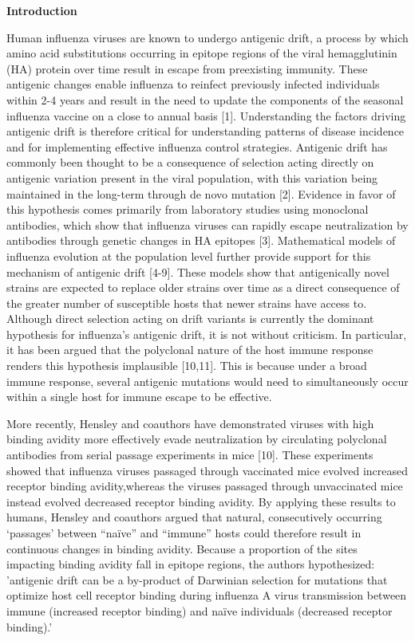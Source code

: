 \documentclass[12pt,a4paper]{article}
\begin{document}
\clearpage

{\bf Introduction}

Human influenza viruses are known to undergo antigenic drift, a process by which amino acid substitutions occurring in epitope regions of the viral hemagglutinin (HA) protein over time result in escape from preexisting immunity. These antigenic changes enable influenza to reinfect previously infected individuals within 2-4 years and result in the need to update the components of the seasonal influenza vaccine on a close to annual basis [1]. Understanding the factors driving antigenic drift is therefore critical for understanding patterns of disease incidence and for implementing effective influenza control strategies.
Antigenic drift has commonly been thought to be a consequence of selection acting directly on antigenic variation present in the viral population, with this variation being maintained in the long-term through de novo mutation [2]. Evidence in favor of this hypothesis comes primarily from laboratory studies using monoclonal antibodies, which show that influenza viruses can rapidly escape neutralization by antibodies through genetic changes in HA epitopes [3]. Mathematical models of influenza evolution at the population level further provide support for this mechanism of antigenic drift [4-9]. These models show that antigenically novel strains are expected to replace older strains over time as a direct consequence of the greater number of susceptible hosts that newer strains have access to. Although direct selection acting on drift variants is currently the dominant hypothesis for influenza’s antigenic drift, it is not without criticism. In particular, it has been argued that the polyclonal nature of the host immune response renders this hypothesis implausible [10,11]. This is because under a broad immune response, several antigenic mutations would need to simultaneously occur within a single host for immune escape to be effective. 

More recently, Hensley and coauthors have demonstrated viruses with high binding avidity more effectively evade neutralization by circulating polyclonal antibodies from serial passage experiments in mice [10]. These experiments showed that influenza viruses passaged through vaccinated mice evolved increased receptor binding avidity,whereas the viruses passaged through unvaccinated mice instead evolved decreased receptor binding avidity. By applying these results to humans, Hensley and coauthors argued that natural, consecutively occurring ‘passages’ between “naïve” and “immune” hosts could therefore result in continuous changes in binding avidity. Because a proportion of the sites impacting binding avidity fall in epitope regions, the authors hypothesized: 'antigenic drift can be a by-product of Darwinian selection for mutations that optimize host cell receptor binding during influenza A virus transmission between immune (increased receptor binding) and naïve individuals (decreased receptor binding).' 
\end{document}
